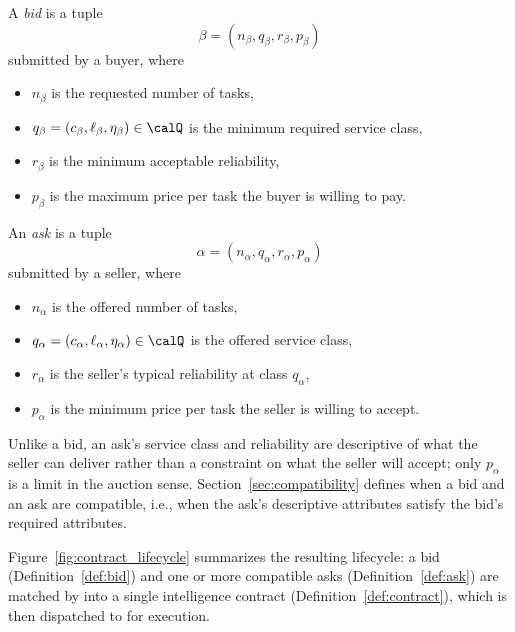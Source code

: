 \begin{definition}[Bid]
\label{def:bid}
A \emph{bid} is a tuple
$$
  \beta = (n_\beta, q_\beta, r_\beta, p_\beta)
$$
submitted by a buyer, where
\begin{itemize}
  \item $n_\beta$ is the requested number of tasks,
  \item $q_\beta = (c_\beta, \ell_\beta, \eta_\beta) \in \calQ$ is the
    minimum required service class,
  \item $r_\beta$ is the minimum acceptable reliability,
  \item $p_\beta$ is the maximum price per task the buyer is willing to
    pay.
\end{itemize}
\end{definition}

\begin{definition}[Ask]
\label{def:ask}
An \emph{ask} is a tuple
$$
  \alpha = (n_\alpha, q_\alpha, r_\alpha, p_\alpha)
$$
submitted by a seller, where
\begin{itemize}
  \item $n_\alpha$ is the offered number of tasks,
  \item $q_\alpha = (c_\alpha, \ell_\alpha, \eta_\alpha) \in \calQ$ is
    the offered service class,
  \item $r_\alpha$ is the seller's typical reliability at class $q_\alpha$,
  \item $p_\alpha$ is the minimum price per task the seller is willing to
    accept.
\end{itemize}
\end{definition}

Unlike a bid, an ask's service class and reliability are descriptive of
what the seller can deliver rather than a constraint on what the seller will
accept; only $p_\alpha$ is a limit in the auction
sense. Section~\ref{sec:compatibility} defines when a bid and an ask are
compatible, i.e., when the ask's descriptive attributes satisfy the bid's
required attributes.

Figure~\ref{fig:contract_lifecycle} summarizes the resulting lifecycle: a
bid (Definition~\ref{def:bid}) and one or more compatible asks
(Definition~\ref{def:ask}) are matched by \NoesisMarket{} into a single
intelligence contract (Definition~\ref{def:contract}), which is then
dispatched to \NoesisServer{} for execution.

